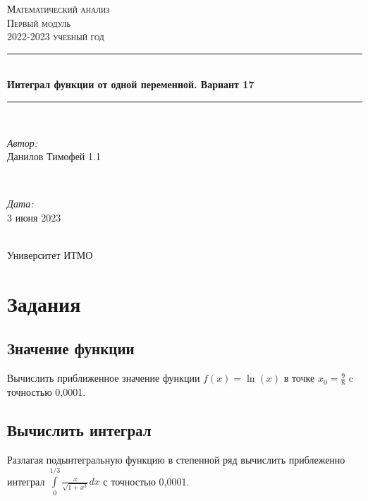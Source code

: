 \documentclass[fleqn]{article}
\begin{document}
\begin{titlepage}
    \centering
    \vspace*{0.5 cm}
    \textsc{\LARGE Математический анализ}\\[1.0 cm]
    \textsc{\Large Первый модуль}\\[0.5 cm]
    \textsc{\large 2022-2023 учебный год}\\[1.5 cm]
    \rule{\linewidth}{0.1 mm} \\[0.4 cm]
    { \huge \bfseries Интеграл функции от одной переменной. Вариант 17}\\[0.2 cm]
    \rule{\linewidth}{0.1 mm} \\[2 cm]
    \begin{minipage}{0.6\textwidth}
        \begin{flushleft} \large
            \emph{Автор:}\\
            Данилов Тимофей 1.1
        \end{flushleft}
    \end{minipage}~
    \begin{minipage}{0.4\textwidth}
        \begin{flushright} \large
            \emph{Дата:} \\
            3 июня 2023
        \end{flushright}
    \end{minipage}\\[2 cm]
    {\large Университет ИТМО}\\[2 cm]
    \vfill
\end{titlepage}

\renewcommand{\contentsname}{Содержимое}
\tableofcontents
\newpage


\section{Задания}

\subsection{Значение функции}

Вычислить приближенное значение функции $f(x) = \ln(x)$ в точке $x_0 = \frac{9}{8}$ c точностью 0,0001.

\subsection{Вычислить интеграл}

Разлагая подынтегральную функцию в степенной ряд вычислить приблеженно интеграл $\int\limits_{0}^{1/3} \frac{x}{\sqrt{1+x^3}}dx$ с точностью 0,0001.
\end{document}
